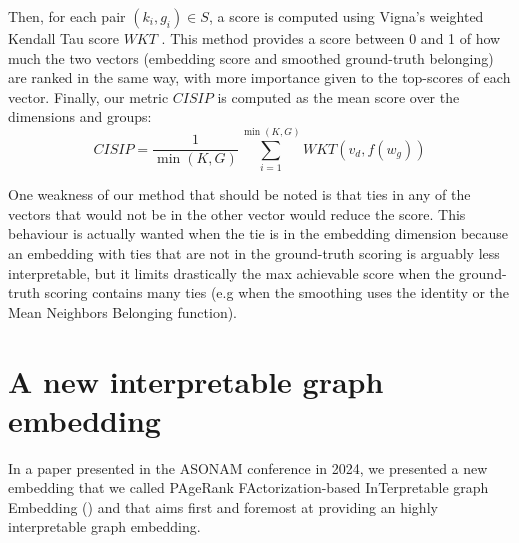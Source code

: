 Then, for each pair $(k_i, g_i) \in S$, a score is computed using Vigna's weighted Kendall Tau score $WKT$ \cite{vigna_2015}. This method provides a score between 0 and 1 of how much the two vectors (embedding score and smoothed ground-truth belonging) are ranked in the same way, with more importance given to the top-scores of each vector. Finally, our metric $CISIP$ is computed as the mean score over the dimensions and groups:
\begin{equation}
    CISIP = \frac{1}{\min(K, G)}\sum_{i=1}^{\min(K, G)}WKT(v_d, f(w_g))
\end{equation}

One weakness of our method that should be noted is that ties in any of the vectors that would not be in the other vector would reduce the score. This behaviour is actually wanted when the tie is in the embedding dimension because an embedding with ties that are not in the ground-truth scoring is arguably less interpretable, but it limits drastically the max achievable score when the ground-truth scoring contains many ties (e.g when the smoothing uses the identity or the Mean Neighbors Belonging function).

\section{A new interpretable graph embedding}%

In a paper presented in the ASONAM conference in 2024, we presented a new embedding that we called PAgeRank FActorization-based InTerpretable graph Embedding (\parfaite) and that aims first and foremost at providing an highly interpretable graph embedding.

